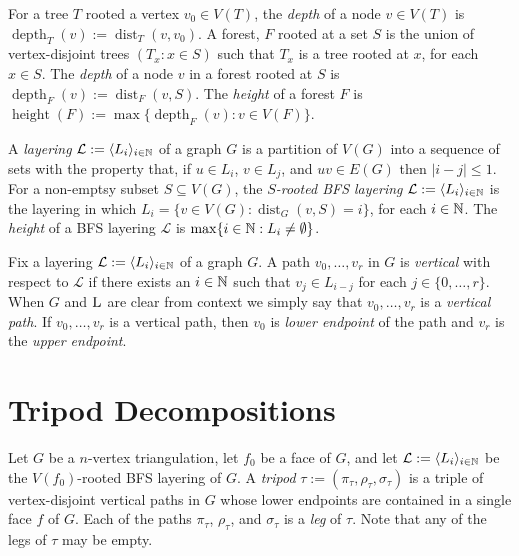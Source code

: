 \documentclass{patmorin}
\DeclareMathOperator{\height}{height}
\DeclareMathOperator{\depth}{depth}
\DeclareMathOperator{\dist}{dist}
\begin{document}
For a tree $T$ rooted a vertex $v_0\in V(T)$, the \emph{depth} of a node $v\in V(T)$ is $\depth_T(v):=\dist_T(v,v_0)$.  A forest, $F$ rooted at a set $S$ is the union of vertex-disjoint trees $(T_x:x\in S)$ such that $T_x$ is a tree rooted at $x$, for each $x\in S$.  The \emph{depth} of a node $v$ in a forest rooted at $S$ is $\depth_F(v):=\dist_F(v,S)$.  The \emph{height} of a forest $F$ is $\height(F):=\max\{\depth_F(v):v\in V(F)\}$.

A \emph{layering} $\mathcal{L}:=\langle L_i\rangle_{i\in\mathbb{N}}$ of a graph $G$ is a partition of $V(G)$ into a sequence of sets with the property that, if $u\in L_i$, $v\in L_j$, and $uv\in E(G)$ then $|i-j|\le 1$. For a non-emptsy subset $S\subseteq V(G)$, the \emph{$S$-rooted BFS layering} $\mathcal{L}:=\langle L_i\rangle_{i\in\mathbb{N}}$ is the layering in which $L_i=\{v\in V(G):\dist_G(v,S)=i\}$, for each $i\in\mathbb{N}$.   The \emph{height} of a BFS layering $\mathcal{L}$ is $\max\{i\in\mathbb{N}: L_i\neq\emptyset\}$.

Fix a layering $\mathcal{L}:=\langle L_i\rangle_{i\in\mathbb{N}}$ of a graph $G$. A path $v_0,\ldots,v_r$ in $G$ is \emph{vertical} with respect to $\mathcal{L}$ if there exists an $i\in\mathbb{N}$ such that $v_j\in L_{i-j}$ for each $j\in\{0,\ldots,r\}$. When $G$ and $\textsc{L}$ are clear from context we simply say that $v_0,\ldots,v_r$ is a \emph{vertical path}.  If $v_0,\ldots,v_r$ is a vertical path, then $v_0$ is \emph{lower endpoint} of the path and $v_r$ is the \emph{upper endpoint}.



\section{Tripod Decompositions}


Let $G$ be a $n$-vertex triangulation, let $f_0$ be a face of $G$, and let $\mathcal{L}:=\langle L_i\rangle_{i\in\mathbb{N}}$ be the $V(f_0)$-rooted BFS layering of $G$.  A \emph{tripod} $\tau:=(\pi_\tau,\rho_\tau,\sigma_\tau)$ is a triple of vertex-disjoint vertical paths in $G$ whose lower endpoints are contained in a single face $f$ of $G$.  Each of the paths $\pi_\tau$, $\rho_\tau$, and $\sigma_\tau$ is a \emph{leg} of $\tau$. Note that any of the legs of $\tau$ may be empty.
\end{document}
